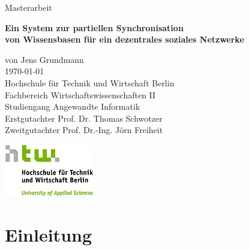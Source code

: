 \documentclass[a4paper]{article}
\begin{document}
	\begin{titlepage}
		\begin{flushright}
			{\large Masterarbeit \\}
			\begin{Large}
				\textbf{
					Ein System zur partiellen Synchronisation \\ 
					von Wissensbasen für ein dezentrales soziales Netzwerke \\
				} 
			\end{Large}
			\vspace{1.0cm}
			\begin{large}	
				von Jens Grundmann \\
				\today \\
				\vspace{1.0cm}
				Hochschule für Technik und Wirtschaft Berlin \\
				Fachbereich Wirtschaftswissenschaften II \\
				Studiengang Angewandte Informatik \\
				\vspace{1.0cm}
				Erstgutachter Prof. Dr. Thomas Schwotzer \\
				Zweitgutachter Prof. Dr.-Ing. Jörn Freiheit \\	
				\vspace{0.5cm}
				\begin{center}
					\includegraphics{../Bilder/htw_logo.jpg}
				\end{center}				
			\end{large}
		\end{flushright}	
	\end{titlepage}
	
	\ClearWallPaper	
	\newpage
	
	
	
	\newpage	
	\tableofcontents
	\newpage

	\section{Einleitung}
	
\end{document}
